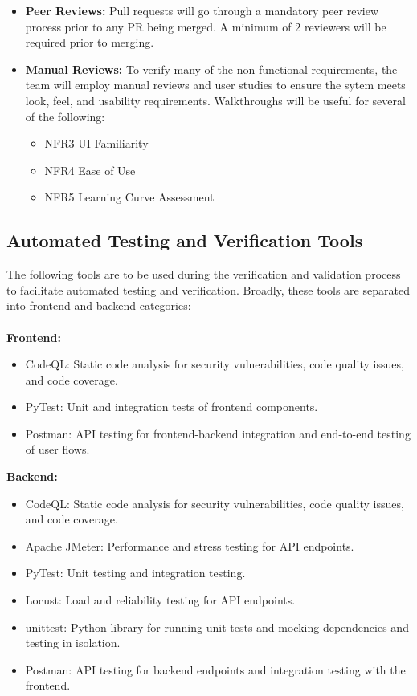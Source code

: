 \documentclass[12pt, titlepage]{article}
\begin{document}
\begin{itemize}
  \item \textbf{Peer Reviews:} Pull requests will go through a mandatory peer review process prior to any PR being merged. A minimum of 2 reviewers will be required prior to merging.
  \item \textbf{Manual Reviews:} To verify many of the non-functional requirements, the team will employ manual reviews and user studies to ensure the sytem meets look, feel, and usability requirements. Walkthroughs will be useful for several of the following:
  \begin{itemize}
    \item NFR3 UI Familiarity
    \item NFR4 Ease of Use
    \item NFR5 Learning Curve Assessment
  \end{itemize}
\end{itemize}


\subsection{Automated Testing and Verification Tools}
\label{sec:automated_tools}

The following tools are to be used during the verification and validation process to facilitate 
automated testing and verification. Broadly, these tools are separated into frontend and backend 
categories:
\\
\\
\textbf{Frontend:}
\begin{itemize}
  \item CodeQL: Static code analysis for security vulnerabilities, code quality issues, and code coverage.
  \item PyTest: Unit and integration tests of frontend components.
  \item Postman: API testing for frontend-backend integration and end-to-end testing of user flows.
\end{itemize}

\textbf{Backend:}
\begin{itemize}
  \item CodeQL: Static code analysis for security vulnerabilities, code quality issues, and code coverage.
  \item Apache JMeter: Performance and stress testing for API endpoints.
  \item PyTest: Unit testing and integration testing.
  \item Locust: Load and reliability testing for API endpoints.
  \item unittest: Python library for running unit tests and mocking dependencies and testing in isolation.
  \item Postman: API testing for backend endpoints and integration testing with the frontend.
\end{itemize}
\end{document}

